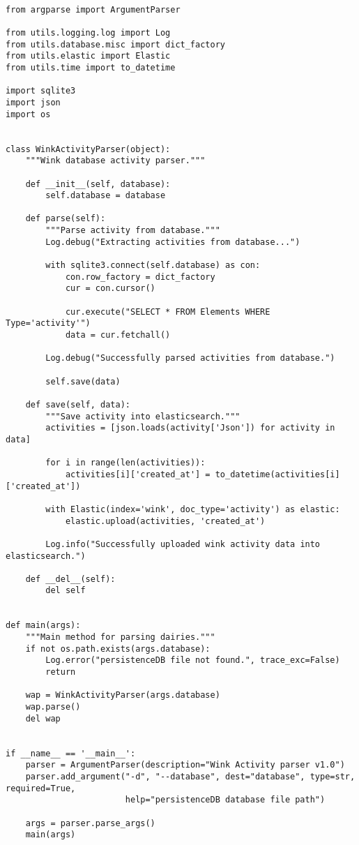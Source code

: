 \documentclass{easychair}
\begin{document}
\lstset{language=Python}
\lstset{frame=lines}
\lstset{basicstyle=\footnotesize}
\begin{lstlisting}

from argparse import ArgumentParser

from utils.logging.log import Log
from utils.database.misc import dict_factory
from utils.elastic import Elastic
from utils.time import to_datetime

import sqlite3
import json
import os


class WinkActivityParser(object):
    """Wink database activity parser."""

    def __init__(self, database):
        self.database = database

    def parse(self):
        """Parse activity from database."""
        Log.debug("Extracting activities from database...")

        with sqlite3.connect(self.database) as con:
            con.row_factory = dict_factory
            cur = con.cursor()

            cur.execute("SELECT * FROM Elements WHERE Type='activity'")
            data = cur.fetchall()

        Log.debug("Successfully parsed activities from database.")

        self.save(data)

    def save(self, data):
        """Save activity into elasticsearch."""
        activities = [json.loads(activity['Json']) for activity in data]

        for i in range(len(activities)):
            activities[i]['created_at'] = to_datetime(activities[i]['created_at'])

        with Elastic(index='wink', doc_type='activity') as elastic:
            elastic.upload(activities, 'created_at')

        Log.info("Successfully uploaded wink activity data into elasticsearch.")

    def __del__(self):
        del self


def main(args):
    """Main method for parsing dairies."""
    if not os.path.exists(args.database):
        Log.error("persistenceDB file not found.", trace_exc=False)
        return

    wap = WinkActivityParser(args.database)
    wap.parse()
    del wap


if __name__ == '__main__':
    parser = ArgumentParser(description="Wink Activity parser v1.0")
    parser.add_argument("-d", "--database", dest="database", type=str, required=True,
                        help="persistenceDB database file path")

    args = parser.parse_args()
    main(args)

\end{lstlisting}
\end{document}
